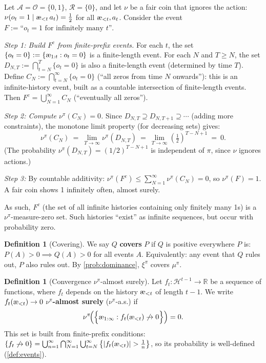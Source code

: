 \documentclass[fontsize=11pt, parskip=half]{scrartcl}
\theoremstyle{definition}
\newtheorem{definition}[theorem]{Definition}
\newcommand{\cA}{\mathcal{A}}
\newcommand{\cO}{\mathcal{O}}
\newcommand{\cR}{\mathcal{R}}
\newcommand{\cH}{\mathcal{H}}
\newcommand{\aes}{\textnormal{\ae}}
\begin{document}
\begin{examplebox}
Let $\cA = \cO = \{0,1\}$, $\cR = \{0\}$, and let $\nu$ be a fair coin that ignores the action: $\nu(o_t = 1 \mid \aes_{<t}\, a_t) = \tfrac{1}{2}$ for all $\aes_{<t}, a_t$.
Consider the event $F := \text{``}o_t = 1\text{ for infinitely many } t\text{''}$.

\medskip
\emph{Step 1: Build $F^c$ from finite-prefix events.}
For each $t$, the set $\{o_t = 0\} := \{\aes_{1:t} : o_t = 0\}$ is a finite-length event.
For each $N$ and $T \geq N$, the set $D_{N,T} := \bigcap_{t=N}^{T} \{o_t = 0\}$ is also a finite-length event (determined by time $T$).
Define $C_N := \bigcap_{t=N}^{\infty} \{o_t = 0\}$ (``all zeros from time $N$ onwards''): this is an infinite-history event, built as a countable intersection of finite-length events.
Then $F^c = \bigcup_{N=1}^\infty C_N$ (``eventually all zeros'').

\medskip
\emph{Step 2: Compute $\nu^\pi(C_N) = 0$.}
Since $D_{N,T} \supseteq D_{N,T+1} \supseteq \cdots$ (adding more constraints), the monotone limit property (for decreasing sets) gives:
\[
    \nu^\pi(C_N)
    ~=~ \lim_{T \to \infty} \nu^\pi(D_{N,T})
    ~=~ \lim_{T \to \infty} \left(\tfrac{1}{2}\right)^{T - N + 1}
    ~=~ 0.
\]
(The probability $\nu^\pi(D_{N,T}) = (1/2)^{T-N+1}$ is independent of $\pi$, since $\nu$ ignores actions.)

\medskip
\emph{Step 3:}
By countable additivity: $\nu^\pi(F^c) \leq \sum_{N=1}^\infty \nu^\pi(C_N) = 0$, so $\nu^\pi(F) = 1$.
A fair coin shows 1 infinitely often, almost surely.

As such, $F^c$ (the set of all infinite histories containing only finitely many 1s) is a $\nu^\pi$-measure-zero set. Such histories ``exist'' as infinite sequences, but occur with probability zero.
\end{examplebox}

\begin{definition}[Covering\protect\footnotemark]\label{def:covering}
We say $Q$ \textbf{covers} $P$ if $Q$ is positive everywhere $P$ is:
$P(A) > 0 \implies Q(A) > 0$ for all events $A$.
Equivalently: any event that $Q$ rules out, $P$ also rules out.
By \cref{prob:dominance}, $\xi^\pi$ covers $\mu^\pi$.
\end{definition}

\begin{definition}[Convergence $\nu^\pi$-almost surely]\label{def:as}
Let $f_t : \cH^{t-1} \to \mathbb{R}$ be a sequence of functions, where $f_t$ depends on the history $\aes_{<t}$ of length $t-1$. We write $f_t(\aes_{<t}) \to 0$ $\nu^\pi$\textbf{-almost surely} ($\nu^\pi$-a.s.) if
\[
    \nu^\pi\!\Big(\Big\{\aes_{1:\infty} : f_t(\aes_{<t}) \not\to 0\Big\}\Big) = 0.
\]
This set is built from finite-prefix conditions:
$\{f_t \not\to 0\} = \bigcup_{n=1}^\infty \bigcap_{N=1}^\infty \bigcup_{t=N}^\infty \big\{|f_t(\aes_{<t})| > \tfrac{1}{n}\big\}$,
so its probability is well-defined (\cref{def:events}).
\end{definition}
\end{document}
